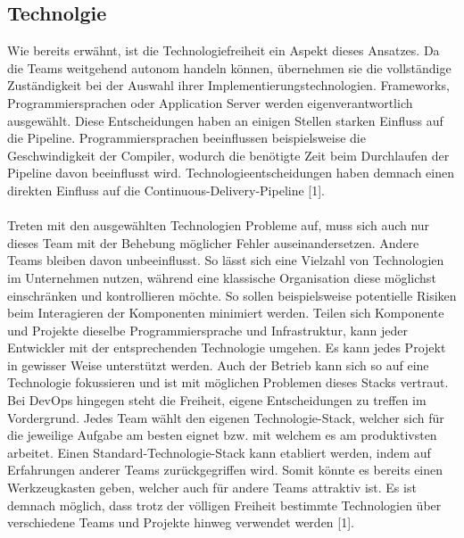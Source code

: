 \subsection{Technolgie}
Wie bereits erwähnt, ist die Technologiefreiheit ein Aspekt dieses Ansatzes. Da die Teams weitgehend autonom handeln können, übernehmen sie die vollständige Zuständigkeit bei der Auswahl ihrer Implementierungstechnologien. Frameworks, Programmiersprachen oder Application Server werden eigenverantwortlich ausgewählt. Diese Entscheidungen haben an einigen Stellen starken Einfluss auf die Pipeline. Programmiersprachen beeinflussen beispielsweise die Geschwindigkeit der Compiler, wodurch die benötigte Zeit beim Durchlaufen der Pipeline davon beeinflusst wird. Technologieentscheidungen haben demnach einen direkten Einfluss auf die Continuous-Delivery-Pipeline [1].\\ \\
Treten mit den ausgewählten Technologien Probleme auf, muss sich auch nur dieses Team mit der Behebung möglicher Fehler auseinandersetzen. Andere Teams bleiben davon unbeeinflusst. So lässt sich eine Vielzahl von Technologien im Unternehmen nutzen, während eine klassische Organisation diese möglichst einschränken und kontrollieren möchte. So sollen beispielsweise potentielle Risiken beim Interagieren der Komponenten minimiert werden. Teilen sich Komponente und Projekte dieselbe Programmiersprache und Infrastruktur, kann jeder Entwickler mit der entsprechenden Technologie umgehen. Es kann jedes Projekt in gewisser Weise unterstützt werden. Auch der Betrieb kann sich so auf eine Technologie fokussieren und ist mit möglichen Problemen dieses Stacks vertraut. Bei DevOps hingegen steht die Freiheit, eigene Entscheidungen zu treffen im Vordergrund. Jedes Team wählt den eigenen Technologie-Stack, welcher sich für die jeweilige Aufgabe am besten eignet bzw. mit welchem es am produktivsten arbeitet. Einen Standard-Technologie-Stack kann etabliert werden, indem auf Erfahrungen anderer Teams zurückgegriffen wird. Somit könnte es bereits einen Werkzeugkasten geben, welcher auch für andere Teams attraktiv ist. Es ist demnach möglich, dass trotz der völligen Freiheit bestimmte Technologien über verschiedene Teams und Projekte hinweg verwendet werden [1].

